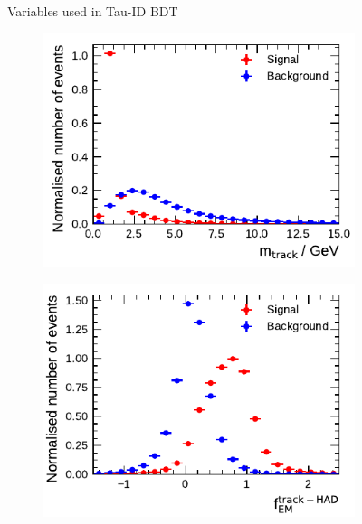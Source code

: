 \begin{figure}[!ht]
\begin{subfigure}{0.5\textwidth}
  \end{subfigure}%
  \caption{Variables used in Tau-ID BDT}
  \label{fig:bdt_vars_3p_overlays}
\end{figure}

\begin{figure}[!ht]\ContinuedFloat
  \begin{subfigure}{0.5\textwidth}
    \centering
    \includegraphics{./figures/baseline_bdt_vars/3p/massTrkSys.pdf}
  \end{subfigure}%
  \begin{subfigure}{0.5\textwidth}
    \centering
    \includegraphics{./figures/baseline_bdt_vars/3p/ChPiEMEOverCaloEME.pdf}
  \end{subfigure}
  \begin{subfigure}{0.5\textwidth}
    \centering

\end{subfigure}
\end{figure}

